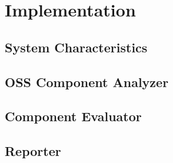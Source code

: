 %
\section{Implementation}\label{sec:implementation}
%
\subsection{System Characteristics}

\subsection{OSS Component Analyzer}

\subsection{Component Evaluator}

\subsection{Reporter}
%

